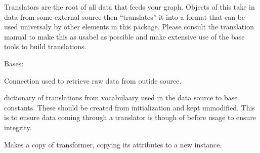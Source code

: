 \documentclass[letterpaper,10pt,english]{sphinxmanual}
\begin{document}
Translators are the root of all data that feeds your graph. Objects of this
take in data from some external source then “translates” it into a format that
can be used universaly by other elements in this package. Please consult the
translation manual to make this as usabel as possible and make extensive use
of the base tools to build translations.

\begin{fulllineitems}
\label{\detokenize{dalio.translator:dalio.translator.translator.Translator}}
Bases: 

\begin{fulllineitems}
\label{\detokenize{dalio.translator:dalio.translator.translator.Translator._source}}
Connection used to retrieve raw data from outide source.

\end{fulllineitems}


\begin{fulllineitems}
\label{\detokenize{dalio.translator:dalio.translator.translator.Translator.translations}}
dictionary of translations from vocabulaary used in the
data source to base constants. These should be created from
initialization and kept unmodified. This is to ensure data coming
through a translator is though of before usage to ensure
integrity.

\end{fulllineitems}


\begin{fulllineitems}
\label{\detokenize{dalio.translator:dalio.translator.translator.Translator.copy}}
Makes a copy of transformer, copying its attributes to a new
instance.


\end{fulllineitems}
\end{fulllineitems}
\end{document}
